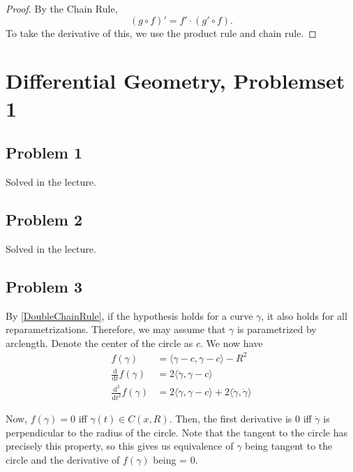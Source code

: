 \begin{proof}
    By the Chain Rule,
\[
    (g\circ f)' = f' \cdot (g' \circ f).
\]
    To take the derivative of this, we use the product rule and chain rule.
\end{proof}

\chapter{Differential Geometry, Problemset 1}

\section*{Problem 1}
Solved in the lecture.

\section*{Problem 2}
Solved in the lecture.

\section*{Problem 3}

By \ref{DoubleChainRule}, if the hypothesis holds for a curve \(\gamma\), it also holds for all reparametrizations. Therefore, we may assume that \(\gamma\) is parametrized by arclength. Denote the center of the circle as \(c\). We now have
\begin{align*}
    f(\gamma) &= \langle \gamma - c, \gamma - c \rangle - R^2 \\
    \frac{\mathrm{d}}{\mathrm{d}t} f(\gamma) &= 2\langle \dot\gamma, \gamma - c \rangle \\
    \frac{\mathrm{d^2}}{\mathrm{d}t^2} f(\gamma) &= 2\langle \ddot\gamma, \gamma - c \rangle + 2\langle \dot\gamma, \dot\gamma \rangle
\end{align*}

Now, \(f(\gamma) = 0\) iff \(\gamma(t) \in C(x, R)\). Then, the first derivative is 0 iff \(\dot\gamma\) is perpendicular to the radius of the circle. Note that the tangent to the circle has precisely this property, so this gives us equivalence of \(\gamma\) being tangent to the circle and the derivative of \(f(\gamma)\) being = 0.


